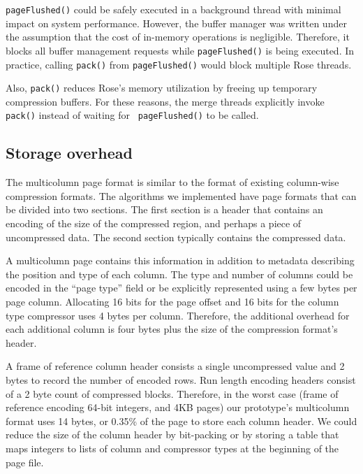 \documentclass{vldb}
\newcommand{\rows}{Rose\xspace}
\newcommand{\rowss}{Rose's\xspace}
\begin{document}
{\tt pageFlushed()} could be safely executed in a background thread
with minimal impact on system performance.  However, the buffer
manager was written under the assumption that the cost of in-memory
operations is negligible.  Therefore, it blocks all buffer management
requests while {\tt pageFlushed()} is being executed.  In practice,
calling {\tt pack()} from {\tt pageFlushed()} would block multiple
\rows threads.

Also, {\tt pack()} reduces \rowss memory utilization by freeing up
temporary compression buffers.
For these reasons, the merge threads
explicitly invoke {\tt pack()} instead of waiting for {\tt
  pageFlushed()} to be called.


\subsection{Storage overhead}

The multicolumn page format is similar to the format of existing
column-wise compression formats.  The algorithms we implemented have
page formats that can be divided into two sections.
The first section is a header that contains an encoding of the size of
the compressed region, and perhaps a piece of uncompressed data.  The second section
typically contains the compressed data.

A multicolumn page contains this information in addition to metadata
describing the position and type of each column.  The type and number
of columns could be encoded in the ``page type'' field or be
explicitly represented using a few bytes per page column.  Allocating
16 bits for the page offset and 16 bits for the column type compressor
uses 4 bytes per column.  Therefore, the additional overhead for each
additional column is four bytes plus the size of the compression
format's header.

A frame of reference column header consists a single uncompressed
value and 2 bytes to record the number of encoded rows.  Run
length encoding headers consist of a 2 byte count of compressed
blocks.  Therefore, in the worst case (frame of reference encoding
64-bit integers, and 4KB pages) our prototype's multicolumn format
uses 14 bytes, or 0.35\% of the page to store each column header.  We
could reduce the size of the column header by bit-packing or by
storing a table that maps integers to lists of column and compressor
types at the beginning of the page file.
\end{document}
